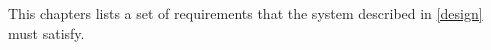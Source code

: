 This chapters lists a set of requirements that the system described in \autoref{design} must satisfy.